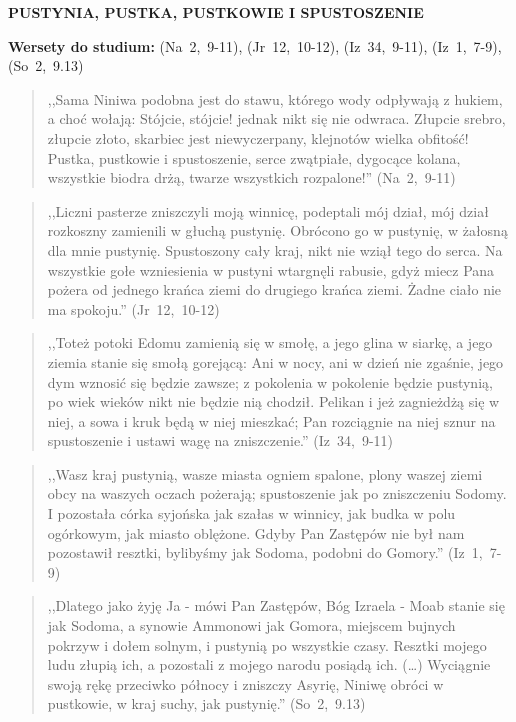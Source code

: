 \documentclass[10pt,a4paper,oneside]{article}
\begin{document}
\centerline{\textbf{\MakeUppercase{Pustynia, pustka, pustkowie i spustoszenie}}}
\begin{center}
\textbf{Wersety do studium:} \mbox{(Na 2, 9-11)}, \mbox{(Jr 12, 10-12)}, \mbox{(Iz 34, 9-11)}, \mbox{(Iz 1, 7-9)}, \mbox{(So 2, 9.13)}
\end{center}
\begin{quote}
,,Sama Niniwa podobna jest do stawu, którego wody odpływają z hukiem, a choć wołają: Stójcie, stójcie! jednak nikt się nie odwraca. Złupcie srebro, złupcie złoto, skarbiec jest niewyczerpany, klejnotów wielka obfitość! Pustka, pustkowie i spustoszenie, serce zwątpiałe, dygocące kolana, wszystkie biodra drżą, twarze wszystkich rozpalone!'' \mbox{(Na 2, 9-11)}
\end{quote}
\begin{quote}
,,Liczni pasterze zniszczyli moją winnicę, podeptali mój dział, mój dział rozkoszny zamienili w głuchą pustynię. Obrócono go w pustynię, w żałosną dla mnie pustynię. Spustoszony cały kraj, nikt nie wziął tego do serca. Na wszystkie gołe wzniesienia w pustyni wtargnęli rabusie, gdyż miecz Pana pożera od jednego krańca ziemi do drugiego krańca ziemi. Żadne ciało nie ma spokoju.'' \mbox{(Jr 12, 10-12)}
\end{quote}
\begin{quote}
,,Toteż potoki Edomu zamienią się w smołę, a jego glina w siarkę, a jego ziemia stanie się smołą gorejącą: Ani w nocy, ani w dzień nie zgaśnie, jego dym wznosić się będzie zawsze; z pokolenia w pokolenie będzie pustynią, po wiek wieków nikt nie będzie nią chodził. Pelikan i jeż zagnieżdżą się w niej, a sowa i kruk będą w niej mieszkać; Pan rozciągnie na niej sznur na spustoszenie i ustawi wagę na zniszczenie.'' \mbox{(Iz 34, 9-11)}
\end{quote}
\begin{quote}
,,Wasz kraj pustynią, wasze miasta ogniem spalone, plony waszej ziemi obcy na waszych oczach pożerają; spustoszenie jak po zniszczeniu Sodomy. I pozostała córka syjońska jak szałas w winnicy, jak budka w polu ogórkowym, jak miasto oblężone. Gdyby Pan Zastępów nie był nam pozostawił resztki, bylibyśmy jak Sodoma, podobni do Gomory.'' \mbox{(Iz 1, 7-9)}
\end{quote}
\begin{quote}
,,Dlatego jako żyję Ja - mówi Pan Zastępów, Bóg Izraela - Moab stanie się jak Sodoma, a synowie Ammonowi jak Gomora, miejscem bujnych pokrzyw i dołem solnym, i pustynią po wszystkie czasy. Resztki mojego ludu złupią ich, a pozostali z mojego narodu posiądą ich. (\ldots) Wyciągnie swoją rękę przeciwko północy i zniszczy Asyrię, Niniwę obróci w pustkowie, w kraj suchy, jak pustynię.'' \mbox{(So 2, 9.13)}
\end{quote}
\end{document}

